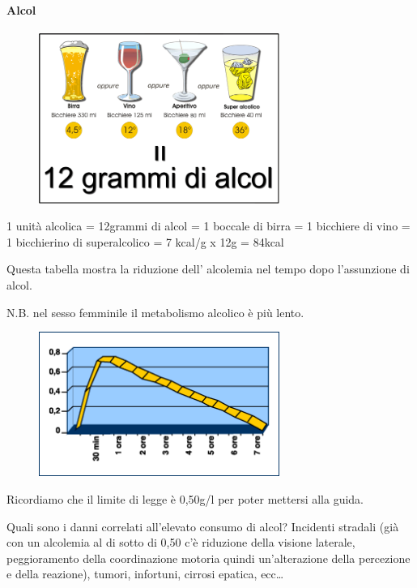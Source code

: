 \paragraph{Alcol}

\begin{figure}[!ht]
\centering
	\includegraphics[width=0.7\textwidth]{20/image13.png}
	\end{figure}

1 unità alcolica = 12grammi di alcol = 1 boccale di birra = 1 bicchiere
di vino = 1 bicchierino di superalcolico = 7 kcal/g x 12g = 84kcal

Questa tabella mostra la riduzione dell' alcolemia nel tempo dopo
l'assunzione di alcol.

N.B. nel sesso femminile il metabolismo alcolico è più lento.

\begin{figure}[!ht]
\centering
	\includegraphics[width=0.7\textwidth]{20/image14.png}
	\end{figure}

Ricordiamo che il limite di legge è 0,50g/l per poter mettersi alla
guida.

Quali sono i danni correlati all'elevato consumo di alcol? Incidenti
stradali (già con un alcolemia al di sotto di 0,50 c'è riduzione della
visione laterale, peggioramento della coordinazione motoria quindi
un'alterazione della percezione e della reazione), tumori, infortuni,
cirrosi epatica, ecc\ldots{}

